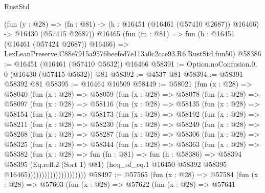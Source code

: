 \begin{lexlean}{RustStd}
\begin{coremodule}
    (fun (y : @28) =>
    (fn : @81) -> (h : @16451 (@16461 (@57410 @2687)) @16466) -> @16430 (@57415 @2687))
    @16465
    (fun (fn : @81) =>
    fun (h : @16451 (@16461 (@57424 @2687)) @16466) =>
    LexLeanPreserve.C88e7915a9576beefed7e113a0c2cce93.R6.RustStd.fun50)
@58386 := @16451 (@16461 (@57410 @5632)) @16466
@58391 := Option.noConfusion.{0, 0} (@16430 (@57415 @5632)) @81
@58392 := @4537 @81
@58394 := @58391 @58392 @81
@58395 := @16464 @16509
@58449 := @58021
    (fun (x : @28) =>
    @58040
      (fun (x : @28) =>
      @58059
        (fun (x : @28) =>
        @58078
          (fun (x : @28) =>
          @58097
            (fun (x : @28) =>
            @58116
              (fun (x : @28) =>
              @58135
                (fun (x : @28) =>
                @58154
                  (fun (x : @28) =>
                  @58173
                    (fun (x : @28) =>
                    @58192
                      (fun (x : @28) =>
                      @58211
                        (fun (x : @28) =>
                        @58230
                          (fun (x : @28) =>
                          @58249
                            (fun (x : @28) =>
                            @58268
                              (fun (x : @28) =>
                              @58287
                                (fun (x : @28) =>
                                @58306
                                  (fun (x : @28) =>
                                  @58325
                                    (fun (x : @28) =>
                                    @58344
                                      (fun (x : @28) =>
                                      @58363
                                        (fun (x : @28) =>
                                        @58382
                                          (fun (x : @28) =>
                                          fun (fn : @81) =>
                                          fun (h : @58386) =>
                                          @58394
                                            @58395
                                            (Eq.refl.{2} (Sort 1) @81)
                                            (heq_of_eq.{1}
                                              @16450
                                              @58392
                                              @58395
                                              @16465)))))))))))))))))))))
@58497 := @57565
    (fun (x : @28) =>
    @57584
      (fun (x : @28) =>
      @57603
        (fun (x : @28) =>
        @57622
          (fun (x : @28) =>
          @57641

\end{coremodule}
\end{lexlean}
